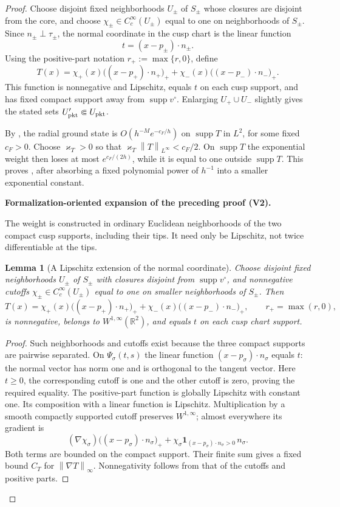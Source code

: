 \documentclass[11pt]{article}
\newtheorem{lemma}[theorem]{Lemma}
\newcommand{\formalisationparentid}{X}
\newenvironment{formalisationaddition}[1]{\par\medskip\begingroup\color{blue}\def\formalisationparentid{#1}\setcounter{formalizationsublemma}{0}\let\lemma\formalizationsublemma\let\endlemma\endformalizationsublemma
  \def\Eo{\mathcal E_h^\circ}\def\EE{\mathcal E_h}\def\phio{\phi_h^\circ}\def\phih{\phi_h}\def\Ho{H_h^{\rm atom}(v^\circ)}\def\Ha{H_h^{\rm atom}}\def\HL{H_h^{L}}\def\Dh{D_h}\def\Log{\operatorname{Log}}\def\ellh{\ell_h}\def\Gp{G_{p,h}}\def\Ast{A_{*,h}}\def\ahat{\widehat{\mathfrak a}_h}\def\ah{\mathfrak a_h}\def\rh{\widehat\rho_h}\def\deltah{\widehat\delta_h}\def\oldref##1{\textup{(##1)}}\def\interface##1{\par\noindent\textit{Analytical interface used here.} ##1\par}\def\finish{\par\noindent\textit{Conclusion of the formalization-oriented expansion.} }\par\noindent\textbf{Formalization-oriented expansion of the preceding proof (V2).}\par\smallskip
}{\par\endgroup\medskip
}
\newcommand{\R}{\mathbb R}
\newcommand{\norm}[1]{\left\|#1\right\|}
\newcommand{\supp}{\operatorname{supp}}
\begin{document}
\begin{proof}
Choose disjoint fixed neighborhoods $U_\pm$ of $S_\pm$ whose closures are
disjoint from the core, and choose $\chi_\pm\in C_c^\infty(U_\pm)$ equal to
one on neighborhoods of $S_\pm$.  Since $n_\pm\perp\tau_\pm$, the normal
coordinate in the cusp chart is the linear function
\[
 t=(x-p_\pm)\cdot n_\pm.
\]
Using the positive-part notation $r_+:=\max\{r,0\}$, define
\[
 T(x)=\chi_+(x)\bigl((x-p_+)\cdot n_+\bigr)_+
      +\chi_-(x)\bigl((x-p_-)\cdot n_-\bigr)_+.
\]
This function is nonnegative and Lipschitz, equals $t$ on each cusp
support, and has fixed compact support away from $\supp v^\circ$.  Enlarging
$U_+\cup U_-$ slightly gives the stated sets $U'_{\rm pkt}\Subset
U_{\rm pkt}$.

By , the radial ground state is
$O(h^{-M}e^{-c_F/h})$ on $\supp T$ in $L^2$, for some fixed $c_F>0$.
Choose $\varkappa_T>0$ so that
$\varkappa_T\norm{T}_{L^\infty}<c_F/2$.  On $\supp T$ the exponential
weight then loses at most $e^{c_F/(2h)}$, while it is equal to one outside
$\supp T$.  This proves , after absorbing a
fixed polynomial power of $h^{-1}$ into a smaller exponential constant.

\begin{formalisationaddition}{LA.1}
The weight is constructed in ordinary Euclidean neighborhoods of the two compact cusp supports, including their tips. It need only be Lipschitz, not twice differentiable at the tips.

\begin{lemma}[A Lipschitz extension of the normal coordinate]\label{sublemma:LA-1-weight}
Choose disjoint fixed neighborhoods $U_\pm$ of $S_\pm$ with closures disjoint from $\supp v^\circ$, and nonnegative cutoffs $\chi_\pm\in C_c^\infty(U_\pm)$ equal to one on smaller neighborhoods of $S_\pm$. Then
\[
 T(x)=\chi_+(x)\bigl((x-p_+)\cdot n_+\bigr)_+
      +\chi_-(x)\bigl((x-p_-)\cdot n_-\bigr)_+,
 \qquad r_+=\max(r,0),
\]
is nonnegative, belongs to $W^{1,\infty}(\R^2)$, and equals $t$ on each cusp chart support.
\end{lemma}
\begin{proof}
Such neighborhoods and cutoffs exist because the three compact supports are pairwise separated. On $\Psi_\sigma(t,s)$ the linear function $(x-p_\sigma)\cdot n_\sigma$ equals $t$: the normal vector has norm one and is orthogonal to the tangent vector. Here $t\ge0$, the corresponding cutoff is one and the other cutoff is zero, proving the required equality. The positive-part function is globally Lipschitz with constant one. Its composition with a linear function is Lipschitz. Multiplication by a smooth compactly supported cutoff preserves $W^{1,\infty}$; almost everywhere its gradient is
\[
 (\nabla\chi_\sigma)\bigl((x-p_\sigma)\cdot n_\sigma\bigr)_+
 +\chi_\sigma\mathbf1_{(x-p_\sigma)\cdot n_\sigma>0}\,n_\sigma.
\]
Both terms are bounded on the compact support. Their finite sum gives a fixed bound $C_T$ for $\norm{\nabla T}_\infty$. Nonnegativity follows from that of the cutoffs and positive parts.
\end{proof}


\end{formalisationaddition}
\end{proof}
\end{document}
